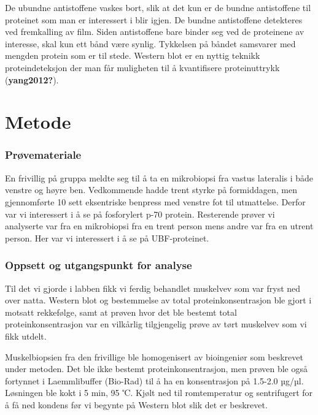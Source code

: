 \documentclass[
  letterpaper,
  DIV=11,
  numbers=noendperiod]{scrreprt}
\begin{document}
De ubundne antistoffene vaskes bort, slik at det kun er de bundne
antistoffene til proteinet som man er interessert i blir igjen. De
bundne antistoffene detekteres ved fremkalling av film. Siden
antistoffene bare binder seg ved de proteinene av interesse, skal kun
ett bånd være synlig. Tykkelsen på båndet samsvarer med mengden protein
som er til stede. Western blot er en nyttig teknikk proteindeteksjon der
man får muligheten til å kvantifisere proteinuttrykk
(\textbf{yang2012?}).

\hypertarget{metode}{%
\section{\texorpdfstring{\textbf{Metode}}{Metode}}\label{metode}}

\hypertarget{pruxf8vemateriale}{%
\subsubsection{\texorpdfstring{\textbf{Prøvemateriale}}{Prøvemateriale}}\label{pruxf8vemateriale}}

En frivillig på gruppa meldte seg til å ta en mikrobiopsi fra vastus
lateralis i både venstre og høyre ben. Vedkommende hadde trent styrke på
formiddagen, men gjennomførte 10 sett eksentriske benpress med venstre
fot til utmattelse. Derfor var vi interessert i å se på fosforylert p-70
protein. Resterende prøver vi analyserte var fra en mikrobiopsi fra en
trent person mens andre var fra en utrent person. Her var vi interessert
i å se på UBF-proteinet.

\hypertarget{oppsett-og-utgangspunkt-for-analyse}{%
\subsubsection{\texorpdfstring{\textbf{Oppsett og utgangspunkt for
analyse}}{Oppsett og utgangspunkt for analyse}}\label{oppsett-og-utgangspunkt-for-analyse}}

Til det vi gjorde i labben fikk vi ferdig behandlet muskelvev som var
fryst ned over natta. Western blot og bestemmelse av total
proteinkonsentrasjon ble gjort i motsatt rekkefølge, samt at prøven hvor
det ble bestemt total proteinkonsentrasjon var en vilkårlig tilgjengelig
prøve av tørt muskelvev som vi fikk utdelt.

Muskelbiopsien fra den frivillige ble homogenisert av bioingeniør som
beskrevet under metoden. Det ble ikke bestemt proteinkonsentrasjon, men
prøven ble også fortynnet i Laemmlibuffer (Bio-Rad) til å ha en
konsentrasjon på 1.5-2.0 µg/µl. Løsningen ble kokt i 5 min, 95 ℃. Kjølt
ned til romtemperatur og sentrifugert for å få ned kondens før vi
begynte på Western blot slik det er beskrevet.
\end{document}
